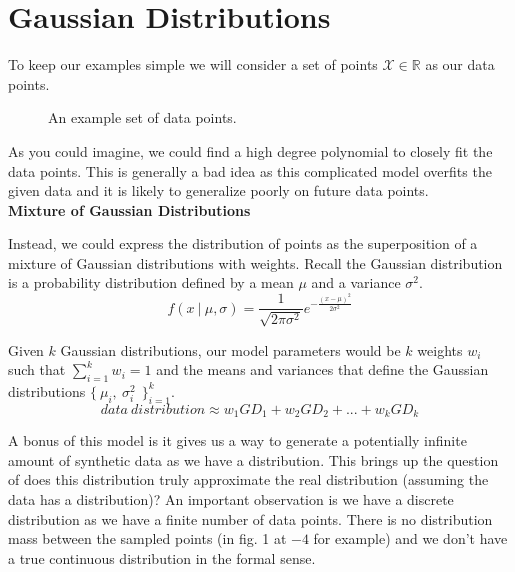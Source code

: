 \documentclass[english,course]{Notes}
\begin{document}
\section{Gaussian Distributions}

To keep our examples simple we will consider a set of points $\mathcal{X} \in \mathbb{R}$ as our data points. \\

\begin{figure}[H]
\centering
{}
\caption{An example set of data points.} \label{fig:M1}
\end{figure}


As you could imagine, we could find a high degree polynomial to closely fit the data points. This is generally a bad idea as this complicated model overfits the given data and it is likely to generalize poorly on future data points. \\ 

\textbf{Mixture of Gaussian Distributions}

Instead, we could express the distribution of points as the superposition of a mixture of Gaussian distributions with weights. Recall the Gaussian distribution is a probability distribution defined by a mean $\mu$ and a variance $\sigma^2$.
\begin{equation}
\label{eq:transition1}
f(x \ \vert \ \mu , \sigma) = \frac{1}{\sqrt{2 \pi \sigma^2}} e^{-\frac{(x - \mu)^2}{2 \sigma^2}}
\end{equation}

Given $k$ Gaussian distributions, our model parameters would be $k$ weights $w_i$ such that $\sum_{i = 1}^k w_i = 1$ and the means and variances that define the Gaussian distributions $\{\ \mu_i, \ \sigma_i^2\ \ \}^k_{i = 1}$.
\begin{equation}
\label{eq:transition1}
data \ distribution \approx w_1GD_1 + w_2GD_2 + ... + w_kGD_k
\end{equation}

A bonus of this model is it gives us a way to generate a potentially infinite amount of synthetic data as we have a distribution. This brings up the question of does this distribution truly approximate the real distribution (assuming the data has a distribution)? An important observation is we have a discrete distribution as we have a finite number of data points. There is no distribution mass between the sampled points (in fig. 1 at $-4$ for example) and we don't have a true continuous distribution in the formal sense. \\
\end{document}
